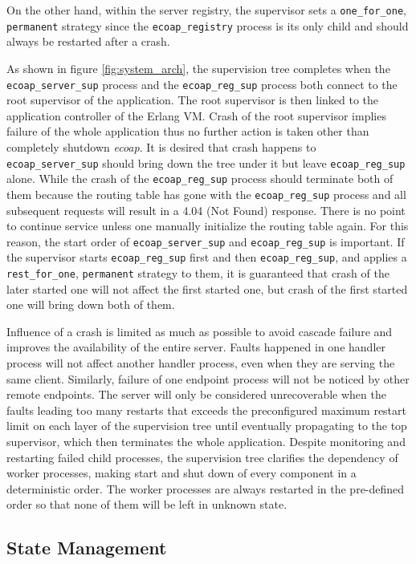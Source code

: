 On the other hand, within the server registry, the supervisor sets a \verb|one_for_one|, \verb|permanent| strategy since the \verb|ecoap_registry| process is its only child and should always be restarted after a crash. 

As shown in figure \ref{fig:system_arch}, the supervision tree completes when the \verb|ecoap_server_sup| process and the \verb|ecoap_reg_sup| process both connect to the root supervisor of the application. The root supervisor is then linked to the application controller of the Erlang VM. Crash of the root supervisor implies failure of the whole application thus no further action is taken other than completely shutdown \textit{ecoap}. It is desired that crash happens to \verb|ecoap_server_sup| should bring down the tree under it but leave \verb|ecoap_reg_sup| alone. While the crash of the \verb|ecoap_reg_sup| process should terminate both of them because the routing table has gone with the \verb|ecoap_reg_sup| process and all subsequent requests will result in a 4.04 (Not Found) response. There is no point to continue service unless one manually initialize the routing table again. For this reason, the start order of \verb|ecoap_server_sup| and \verb|ecoap_reg_sup| is important. If the supervisor starts \verb|ecoap_reg_sup| first and then \verb|ecoap_reg_sup|, and applies a \verb|rest_for_one|, \verb|permanent| strategy to them, it is guaranteed that crash of the later started one will not affect the first started one, but crash of the first started one will bring down both of them. 

Influence of a crash is limited as much as possible to avoid cascade failure and improves the availability of the entire server. Faults happened in one handler process will not affect another handler process, even when they are serving the same client. Similarly, failure of one endpoint process will not be noticed by other remote endpoints. The server will only be considered unrecoverable when the faults leading too many restarts that exceeds the preconfigured maximum restart limit on each layer of the supervision tree until eventually propagating to the top supervisor, which then terminates the whole application. Despite monitoring and restarting failed child processes, the supervision tree clarifies the dependency of worker processes, making start and shut down of every component in a deterministic order. The worker processes are always restarted in the pre-defined order so that none of them will be left in unknown state. 

\subsection{State Management}\label{state_management}

